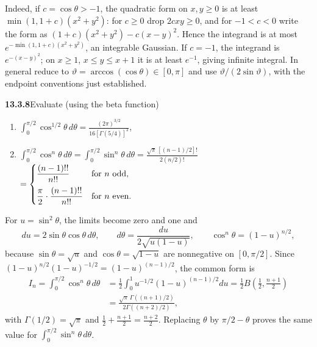 Indeed, if $c=\cos\theta>-1$, the quadratic form on $x,y\ge0$
is at least $\min(1,1+c)(x^2+y^2)$: for $c\ge0$ drop
$2cxy\ge0$, and for $-1<c<0$ write the form as
$(1+c)(x^2+y^2)-c(x-y)^2$.  Hence the integrand is at most
$e^{-\min(1,1+c)(x^2+y^2)}$, an integrable Gaussian.
If $c=-1$, the integrand is $e^{-(x-y)^2}$;
on $x\ge1$, $x\le y\le x+1$ it is at least $e^{-1}$, giving
infinite integral.  In general reduce to
$\vartheta=\arccos(\cos\theta)\in[0,\pi]$ and use
$\vartheta/(2\sin\vartheta)$, with the endpoint conventions just
established.


\par\bigskip
\noindent\textbf{13.3.8}\quad Evaluate (using the beta function)
\begin{enumerate}
\item[(a)] $\displaystyle\int_{0}^{\pi/2}\cos^{1/2}\theta\,d\theta
  =\frac{(2\pi)^{3/2}}{16[\Gamma(5/4)]^{2}}$,
\item[(b)] $\displaystyle\int_{0}^{\pi/2}\cos^{n}\theta\,d\theta
  =\int_{0}^{\pi/2}\sin^{n}\theta\,d\theta
  =\frac{\sqrt{\pi}\,[(n-1)/2]!}{2(n/2)!}$\\[4pt]
  $\hfill=\begin{cases}
  \dfrac{(n-1)!!}{n!!} & \text{for }n\text{ odd},\\[8pt]
  \dfrac{\pi}{2}\cdot\dfrac{(n-1)!!}{n!!} & \text{for }n\text{ even}.
  \end{cases}$
\end{enumerate}
\par\smallskip
{}
\solution
For $u=\sin^2\theta$, the limits become zero and one and
\[
du=2\sin\theta\cos\theta\,d\theta,\qquad
d\theta=\frac{du}{2\sqrt{u(1-u)}},\qquad
\cos^n\theta=(1-u)^{n/2},
\]
because $\sin\theta=\sqrt u$ and $\cos\theta=\sqrt{1-u}$ are
nonnegative on $[0,\pi/2]$.  Since
$(1-u)^{n/2}(1-u)^{-1/2}=(1-u)^{(n-1)/2}$, the common form is
\begin{align*}
I_n=\int_0^{\pi/2}\cos^n\theta\,d\theta
&=\frac12\int_0^1u^{-1/2}(1-u)^{(n-1)/2}du
=\frac12B\left(\frac12,\frac{n+1}2\right)\\
&=\frac{\sqrt\pi\,\Gamma((n+1)/2)}{2\Gamma((n+2)/2)},
\end{align*}
with $\Gamma(1/2)=\sqrt\pi$ and $\frac12+\frac{n+1}2=\frac{n+2}2$.
Replacing $\theta$ by $\pi/2-\theta$ proves the same value for
$\int_0^{\pi/2}\sin^n\theta\,d\theta$.

